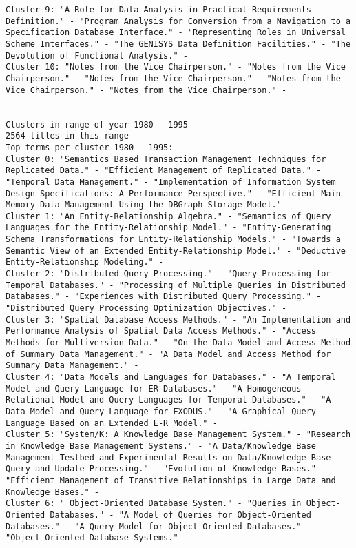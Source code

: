 \documentclass[11pt]{article}
\begin{document}
\begin{verbatim}
Cluster 9: "A Role for Data Analysis in Practical Requirements Definition." - "Program Analysis for Conversion from a Navigation to a Specification Database Interface." - "Representing Roles in Universal Scheme Interfaces." - "The GENISYS Data Definition Facilities." - "The Devolution of Functional Analysis." - 
Cluster 10: "Notes from the Vice Chairperson." - "Notes from the Vice Chairperson." - "Notes from the Vice Chairperson." - "Notes from the Vice Chairperson." - "Notes from the Vice Chairperson." - 


Clusters in range of year 1980 - 1995
2564 titles in this range
Top terms per cluster 1980 - 1995:
Cluster 0: "Semantics Based Transaction Management Techniques for Replicated Data." - "Efficient Management of Replicated Data." - "Temporal Data Management." - "Implementation of Information System Design Specifications: A Performance Perspective." - "Efficient Main Memory Data Management Using the DBGraph Storage Model." - 
Cluster 1: "An Entity-Relationship Algebra." - "Semantics of Query Languages for the Entity-Relationship Model." - "Entity-Generating Schema Transformations for Entity-Relationship Models." - "Towards a Semantic View of an Extended Entity-Relationship Model." - "Deductive Entity-Relationship Modeling." - 
Cluster 2: "Distributed Query Processing." - "Query Processing for Temporal Databases." - "Processing of Multiple Queries in Distributed Databases." - "Experiences with Distributed Query Processing." - "Distributed Query Processing Optimization Objectives." - 
Cluster 3: "Spatial Database Access Methods." - "An Implementation and Performance Analysis of Spatial Data Access Methods." - "Access Methods for Multiversion Data." - "On the Data Model and Access Method of Summary Data Management." - "A Data Model and Access Method for Summary Data Management." - 
Cluster 4: "Data Models and Languages for Databases." - "A Temporal Model and Query Language for ER Databases." - "A Homogeneous Relational Model and Query Languages for Temporal Databases." - "A Data Model and Query Language for EXODUS." - "A Graphical Query Language Based on an Extended E-R Model." - 
Cluster 5: "System/K: A Knowledge Base Management System." - "Research in Knowledge Base Management Systems." - "A Data/Knowledge Base Management Testbed and Experimental Results on Data/Knowledge Base Query and Update Processing." - "Evolution of Knowledge Bases." - "Efficient Management of Transitive Relationships in Large Data and Knowledge Bases." - 
Cluster 6: " Object-Oriented Database System." - "Queries in Object-Oriented Databases." - "A Model of Queries for Object-Oriented Databases." - "A Query Model for Object-Oriented Databases." - "Object-Oriented Database Systems." - 

\end{verbatim}
\end{document}
